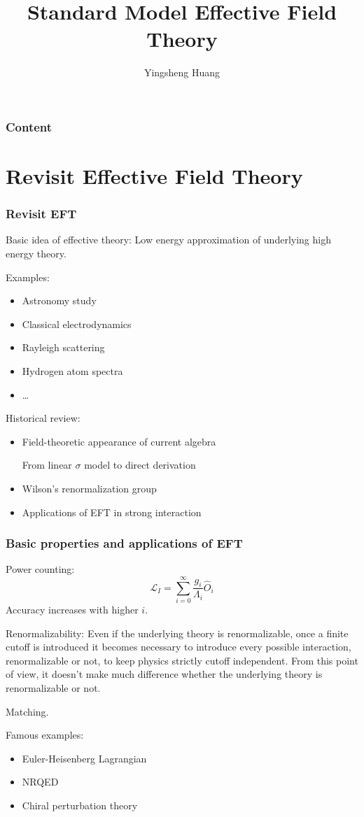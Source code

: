 \documentclass[8pt]{beamer}
\title{Standard Model Effective Field Theory}
\author{Yingsheng Huang}
\institute{Institute of High Energy Physics}
\newcommand{\lag}{\mathcal{L}}
\begin{document}
\maketitle
\begin{frame}
  \frametitle{Content}
  \tableofcontents
\end{frame}
\section{Revisit Effective Field Theory}
\begin{frame}
  \frametitle{Revisit EFT}
  Basic idea of effective theory: Low energy approximation of underlying high energy theory.

  Examples:
  \begin{itemize}
    \item Astronomy study
    \item Classical electrodynamics
	\item Rayleigh scattering
	\item Hydrogen atom spectra
    \item \dots
  \end{itemize}
  Historical review:
  \begin{itemize}
    \item Field-theoretic appearance of current algebra

    From linear $\sigma$ model to direct derivation
    \item Wilson's renormalization group
	\item Applications of EFT in strong interaction
  \end{itemize}
\end{frame}
\begin{frame}
    \frametitle{Basic properties and applications of EFT}
    Power counting:
    $$\lag_I=\sum_{i=0}^{\infty}\frac{g_i}{\Lambda_i}\hat O_i$$
    Accuracy increases with higher $i$.

    Renormalizability: Even if the underlying theory
is renormalizable, once a finite cutoff is introduced it becomes necessary to
introduce every possible interaction, renormalizable or not, to keep physics
strictly cutoff independent. From this point of view, it doesn’t make much
difference whether the underlying theory is renormalizable or not.

	Matching.

    Famous examples:
    \begin{itemize}
      \item Euler-Heisenberg Lagrangian
      \item NRQED
      \item Chiral perturbation theory
    \end{itemize}
\end{frame}
\end{document}
